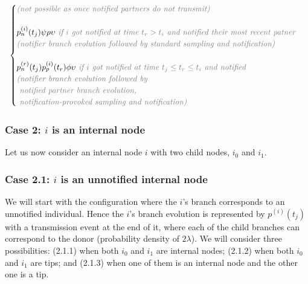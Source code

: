 \documentclass[a4paper,10pt]{article}
\begin{document}
\begin{equation}
\begin{array}{ll}
\begin{cases}
\textit{\color{gray} (not possible as once notified partners do not transmit)}\\
\\
p_n^{(i)}(t_j)\psi\rho\upsilon \textit{\color{gray} ~if $i$ got notified at time $t_r > t_i$ and notified their most recent patner}\\
\textit{\color{gray} (notifier branch evolution followed by standard sampling and  notification)}\\
\\
p_n^{(r)}(t_j) p_p^{(i)}(t_r) \phi \upsilon \textit{\color{gray} ~if $i$ got notified at time $t_j \leq t_r \leq t_i$ and notified}\\
\textit{\color{gray} (notifier branch evolution followed by} \\
\textit{\color{gray}~notified partner branch evolution,} \\
\textit{\color{gray}~notification-provoked sampling and notification)}\\
\end{cases}\\
\end{array}
\label{eq:tip}
\end{equation}

\subsubsection*{Case 2: $i$ is an internal node} 
Let us now consider an internal node $i$ with two child nodes, $i_0$ and $i_1$. 

\subsubsection*{Case 2.1: $i$ is an unnotified internal node} 
We will start with the configuration where the $i$'s branch corresponds to an unnotified individual. Hence the $i$'s branch evolution is represented by $p^{(i)}(t_j)$ with a transmission event at the end of it, where each of the child branches can correspond to the donor (probability density of $2\lambda$). We will consider three possibilities: (2.1.1) when both $i_0$ and $i_1$ are internal nodes; (2.1.2) when both $i_0$ and $i_1$ are tips; and (2.1.3) when one of them is an internal node and the other one is a tip.

\end{document}

